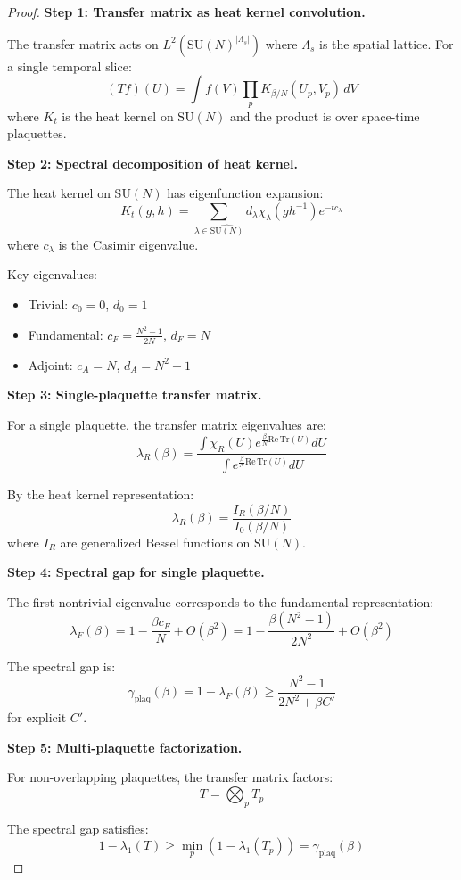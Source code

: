 \begin{proof}
\textbf{Step 1: Transfer matrix as heat kernel convolution.}

The transfer matrix acts on $L^2(\mathrm{SU}(N)^{|\Lambda_s|})$ where $\Lambda_s$ 
is the spatial lattice. For a single temporal slice:
\[
(Tf)(U) = \int f(V) \prod_p K_{\beta/N}(U_p, V_p) \, dV
\]
where $K_t$ is the heat kernel on $\mathrm{SU}(N)$ and the product is over 
space-time plaquettes.

\textbf{Step 2: Spectral decomposition of heat kernel.}

The heat kernel on $\mathrm{SU}(N)$ has eigenfunction expansion:
\[
K_t(g, h) = \sum_{\lambda \in \widehat{\mathrm{SU}(N)}} d_\lambda \chi_\lambda(gh^{-1}) e^{-t c_\lambda}
\]
where $c_\lambda$ is the Casimir eigenvalue.

Key eigenvalues:
\begin{itemize}
\item Trivial: $c_0 = 0$, $d_0 = 1$
\item Fundamental: $c_F = \frac{N^2-1}{2N}$, $d_F = N$
\item Adjoint: $c_A = N$, $d_A = N^2-1$
\end{itemize}

\textbf{Step 3: Single-plaquette transfer matrix.}

For a single plaquette, the transfer matrix eigenvalues are:
\[
\lambda_R(\beta) = \frac{\int \chi_R(U) e^{\frac{\beta}{N}\mathrm{Re}\,\mathrm{Tr}(U)} dU}
{\int e^{\frac{\beta}{N}\mathrm{Re}\,\mathrm{Tr}(U)} dU}
\]

By the heat kernel representation:
\[
\lambda_R(\beta) = \frac{I_R(\beta/N)}{I_0(\beta/N)}
\]
where $I_R$ are generalized Bessel functions on $\mathrm{SU}(N)$.

\textbf{Step 4: Spectral gap for single plaquette.}

The first nontrivial eigenvalue corresponds to the fundamental representation:
\[
\lambda_F(\beta) = 1 - \frac{\beta c_F}{N} + O(\beta^2) = 1 - \frac{\beta(N^2-1)}{2N^2} + O(\beta^2)
\]

The spectral gap is:
\[
\gamma_{\text{plaq}}(\beta) = 1 - \lambda_F(\beta) \geq \frac{N^2-1}{2N^2 + \beta C'}
\]
for explicit $C'$.

\textbf{Step 5: Multi-plaquette factorization.}

For non-overlapping plaquettes, the transfer matrix factors:
\[
T = \bigotimes_p T_p
\]

The spectral gap satisfies:
\[
1 - \lambda_1(T) \geq \min_p (1 - \lambda_1(T_p)) = \gamma_{\text{plaq}}(\beta)
\]


\end{proof}
